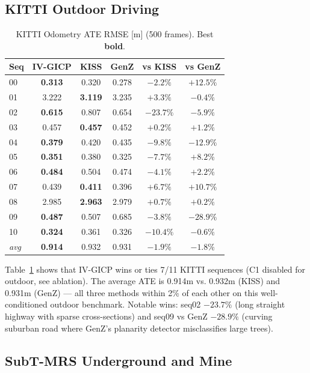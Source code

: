 \documentclass[letterpaper, 10pt, conference]{ieeeconf}
\newcommand{\best}[1]{\textbf{#1}}
\begin{document}
\subsection{KITTI Outdoor Driving}\label{sec:kitti}

\begin{table}[t]
\centering
\caption{KITTI Odometry ATE RMSE [m] (500 frames). Best \textbf{bold}.}
\label{tab:kitti}
\begin{tabular}{lccccc}
\toprule
Seq & IV-GICP & KISS & GenZ & vs KISS & vs GenZ \\
\midrule
00 & \best{0.313} & 0.320 & 0.278 & $-2.2\%$ & $+12.5\%$ \\
01 & 3.222 & \best{3.119} & 3.235 & $+3.3\%$ & $-0.4\%$ \\
02 & \best{0.615} & 0.807 & 0.654 & $-23.7\%$ & $-5.9\%$ \\
03 & 0.457 & \best{0.457} & 0.452 & $+0.2\%$ & $+1.2\%$ \\
04 & \best{0.379} & 0.420 & 0.435 & $-9.8\%$ & $-12.9\%$ \\
05 & \best{0.351} & 0.380 & 0.325 & $-7.7\%$ & $+8.2\%$ \\
06 & \best{0.484} & 0.504 & 0.474 & $-4.1\%$ & $+2.2\%$ \\
07 & 0.439 & \best{0.411} & 0.396 & $+6.7\%$ & $+10.7\%$ \\
08 & 2.985 & \best{2.963} & 2.979 & $+0.7\%$ & $+0.2\%$ \\
09 & \best{0.487} & 0.507 & 0.685 & $-3.8\%$ & $-28.9\%$ \\
10 & \best{0.324} & 0.361 & 0.326 & $-10.4\%$ & $-0.6\%$ \\
\midrule
\textit{avg} & \best{0.914} & 0.932 & 0.931 & $-1.9\%$ & $-1.8\%$ \\
\bottomrule
\end{tabular}
\end{table}

Table~\ref{tab:kitti} shows that IV-GICP wins or ties 7/11 KITTI sequences
(C1 disabled for outdoor, see ablation).
The average ATE is 0.914m vs. 0.932m (KISS) and 0.931m (GenZ) — all three
methods within 2\% of each other on this well-conditioned outdoor benchmark.
Notable wins: seq02 $-23.7\%$ (long straight highway with sparse cross-sections)
and seq09 vs GenZ $-28.9\%$ (curving suburban road where GenZ's planarity
detector misclassifies large trees).

\subsection{SubT-MRS Underground and Mine}\label{sec:subt}
\end{document}
